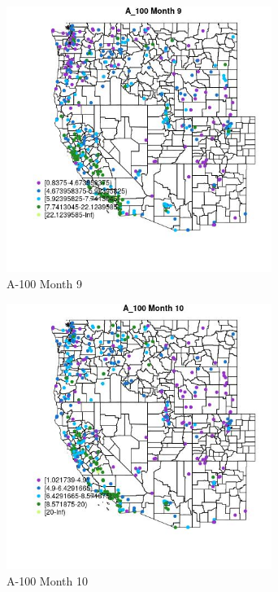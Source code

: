 \begin{figure} 
\centering  
\includegraphics[width=0.77\textwidth]{Code_Outputs/ML_input_report_ML_input_PM25_Step5_part_d_de_duplicated_aves_ML_input_MapObsMo9A_100.jpg} 
\caption{\label{fig:ML_input_report_ML_input_PM25_Step5_part_d_de_duplicated_aves_ML_inputMapObsMo9A_100}A-100 Month 9} 
\end{figure} 
 

\begin{figure} 
\centering  
\includegraphics[width=0.77\textwidth]{Code_Outputs/ML_input_report_ML_input_PM25_Step5_part_d_de_duplicated_aves_ML_input_MapObsMo10A_100.jpg} 
\caption{\label{fig:ML_input_report_ML_input_PM25_Step5_part_d_de_duplicated_aves_ML_inputMapObsMo10A_100}A-100 Month 10} 
\end{figure} 
 

